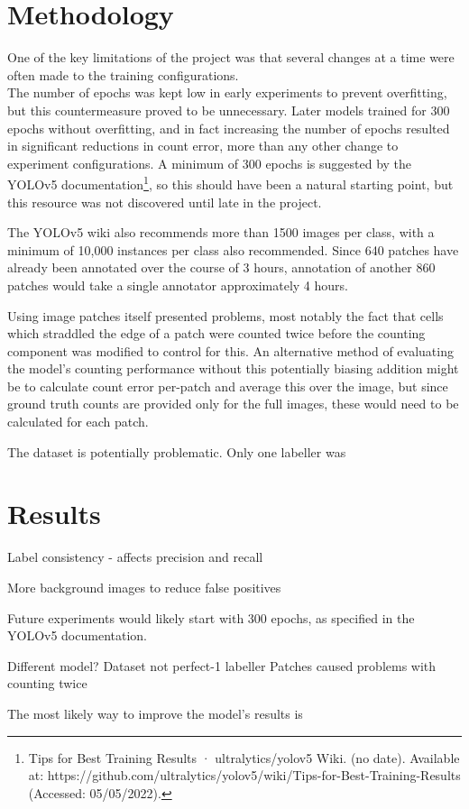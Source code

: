 \section{Methodology}
One of the key limitations of the project was that several changes at a time were often made to the training configurations.\\

The number of epochs was kept low in early experiments to prevent overfitting, but this countermeasure proved to be unnecessary. Later models trained for 300 epochs without overfitting, and in fact increasing the number of epochs resulted in significant reductions in count error, more than any other change to experiment configurations. A minimum of 300 epochs is suggested by the YOLOv5 documentation\footnote{Tips for Best Training Results · ultralytics/yolov5 Wiki. (no date). Available at: https://github.com/ultralytics/yolov5/wiki/Tips-for-Best-Training-Results (Accessed: 05/05/2022).}, so this should have been a natural starting point, but this resource was not discovered until late in the project.

The YOLOv5 wiki also recommends more than 1500 images per class, with a minimum of 10,000 instances per class also recommended. Since 640 patches have already been annotated over the course of 3 hours, annotation of another 860 patches would take a single annotator approximately 4 hours.

Using image patches itself presented problems, most notably the fact that cells which straddled the edge of a patch were counted twice before the counting component was modified to control for this. An alternative method of evaluating the model's counting performance without this potentially biasing addition might be to calculate count error per-patch and average this over the image, but since ground truth counts are provided only for the full images, these would need to be calculated for each patch.

The dataset is potentially problematic. Only one labeller was 

\section{Results}


Label consistency - affects precision and recall

More background images to reduce false positives

Future experiments would likely start with 300 epochs, as specified in the YOLOv5 documentation.

Different model?
Dataset not perfect-1 labeller
Patches caused problems with counting twice

The most likely way to improve the model's results is
